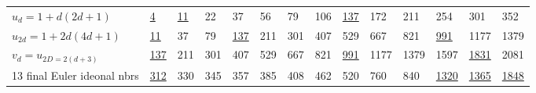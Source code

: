 \documentclass[a4paper,9pt]{article}
\begin{document}
\begin{table}
\begin{tabular}{llllllllllllll}
     
      
      
      
      
      $u_d = 1 + d(2d+1)$ & \underline {4} & \underline {11} & 22 & 37 & 56 & 79 & 106 & \underline{137}  & 172 & 211 & 254 & 301 & 352 \\
       
      
    
      $u_{2d} = 1 + 2d(4d+1)$ & \underline{11}  & 37 & 79 & \underline{137}  & 211 & 301 & 407 & 529  & 667 & 821 & \underline{991} & 1177 & 1379 \\
      
      $v_d = u_{2 D = 2(d+3)}$ & \underline{137}  & 211 & 301 & 407 & 529 & 667 & 821 & \underline{991} & 1177 & 1379 & 1597 & \underline{1831} & 2081 \\
      
      13 final Euler ideonal nbrs  & \underline {312} & 330 & 345 & 357 & 385 & 408 & 462 & 520 & 760 & 840 & \underline{1320}  & \underline{1365} &\underline{1848}\\
     


\end{tabular}
\end{table}
\end{document}
